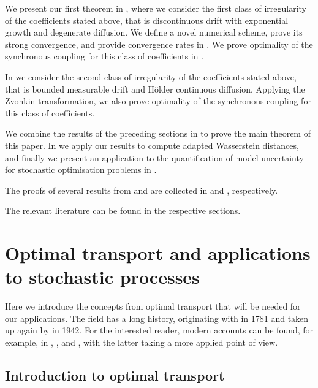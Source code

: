 \documentclass[onseside, final]{amsart}
\theoremstyle{definition}
\numberwithin{equation}{section}
\begin{document}
			We present our first theorem in , where we consider the first class of irregularity of the coefficients stated above, that is discontinuous drift with exponential growth and degenerate diffusion. We define a novel numerical scheme, prove its strong convergence, and provide convergence rates in . We prove optimality of the synchronous coupling for this class of coefficients in .
			
			In  we consider the second class of irregularity of the coefficients stated above, that is bounded measurable drift and H\"older continuous diffusion. Applying the Zvonkin transformation, we also prove optimality of the synchronous coupling for this class of coefficients.
			
			We combine the results of the preceding sections in  to prove the main theorem of this paper.
			In  we apply our results to compute adapted Wasserstein distances, and finally we present an application to the quantification of model uncertainty for stochastic optimisation problems in .
			
			The proofs of several results from  and  are collected in  and , respectively.
			
			The relevant literature can be found in the respective sections.
		

\section{Optimal transport and applications to stochastic processes}\label{sec:OT}

	Here we introduce the concepts from optimal transport that will be needed for our applications. The field has a long history, originating with \citet{Monge} in 1781 and taken up again by \citet{Kant42} in 1942. For the interested reader, modern accounts can be found, for example, in \citet{Vi03}, \citet{AGS}, and \citet{Sa15}, with the latter taking a more applied point of view. 
	
	\subsection{Introduction to optimal transport}\label{sec:OT-intro}
	
\end{document}
